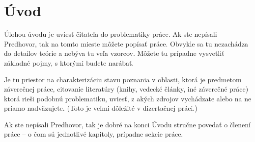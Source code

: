 \chapter{Úvod}

Úlohou úvodu je uviesť čitateľa do problematiky práce. Ak ste nepísali Predhovor, tak na tomto mieste môžete popísať práce. Obvykle sa tu nezachádza do detailov teórie a nebýva tu veľa vzorcov. Môžete tu prípadne vysvetliť základné pojmy, s ktorými budete narábať.

Je tu priestor na charakterizáciu stavu poznania v oblasti, ktorá je predmetom záverečnej práce, citovanie literatúry (knihy, vedecké články, iné záverečné práce) ktorá rieši podobnú problematiku, uviesť, z akých zdrojov vychádzate alebo na ne priamo nadväzujete. (Toto je veľmi dôležité v dizertačnej práci.)

Ak ste nepísali Predhovor, tak je dobré  na konci Úvodu stručne povedať o členení práce -- o čom sú jednotlivé kapitoly, prípadne sekcie práce.
